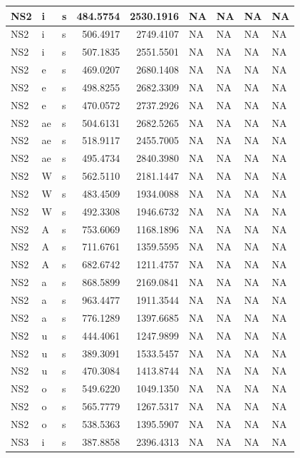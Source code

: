 \documentclass[man, fleqn, noextraspace]{apa6}
\begin{document}
\begin{tabular}{l|l|l|r|r|l|l|l|l}
\hline
NS2 & i & s & 484.5754 & 2530.1916 & NA & NA & NA & NA\\
\hline
NS2 & i & s & 506.4917 & 2749.4107 & NA & NA & NA & NA\\
\hline
NS2 & i & s & 507.1835 & 2551.5501 & NA & NA & NA & NA\\
\hline
NS2 & e & s & 469.0207 & 2680.1408 & NA & NA & NA & NA\\
\hline
NS2 & e & s & 498.8255 & 2682.3309 & NA & NA & NA & NA\\
\hline
NS2 & e & s & 470.0572 & 2737.2926 & NA & NA & NA & NA\\
\hline
NS2 & ae & s & 504.6131 & 2682.5265 & NA & NA & NA & NA\\
\hline
NS2 & ae & s & 518.9117 & 2455.7005 & NA & NA & NA & NA\\
\hline
NS2 & ae & s & 495.4734 & 2840.3980 & NA & NA & NA & NA\\
\hline
NS2 & W & s & 562.5110 & 2181.1447 & NA & NA & NA & NA\\
\hline
NS2 & W & s & 483.4509 & 1934.0088 & NA & NA & NA & NA\\
\hline
NS2 & W & s & 492.3308 & 1946.6732 & NA & NA & NA & NA\\
\hline
NS2 & A & s & 753.6069 & 1168.1896 & NA & NA & NA & NA\\
\hline
NS2 & A & s & 711.6761 & 1359.5595 & NA & NA & NA & NA\\
\hline
NS2 & A & s & 682.6742 & 1211.4757 & NA & NA & NA & NA\\
\hline
NS2 & a & s & 868.5899 & 2169.0841 & NA & NA & NA & NA\\
\hline
NS2 & a & s & 963.4477 & 1911.3544 & NA & NA & NA & NA\\
\hline
NS2 & a & s & 776.1289 & 1397.6685 & NA & NA & NA & NA\\
\hline
NS2 & u & s & 444.4061 & 1247.9899 & NA & NA & NA & NA\\
\hline
NS2 & u & s & 389.3091 & 1533.5457 & NA & NA & NA & NA\\
\hline
NS2 & u & s & 470.3084 & 1413.8744 & NA & NA & NA & NA\\
\hline
NS2 & o & s & 549.6220 & 1049.1350 & NA & NA & NA & NA\\
\hline
NS2 & o & s & 565.7779 & 1267.5317 & NA & NA & NA & NA\\
\hline
NS2 & o & s & 538.5363 & 1395.5907 & NA & NA & NA & NA\\
\hline
NS3 & i & s & 387.8858 & 2396.4313 & NA & NA & NA & NA\\

\end{tabular}
\end{document}
